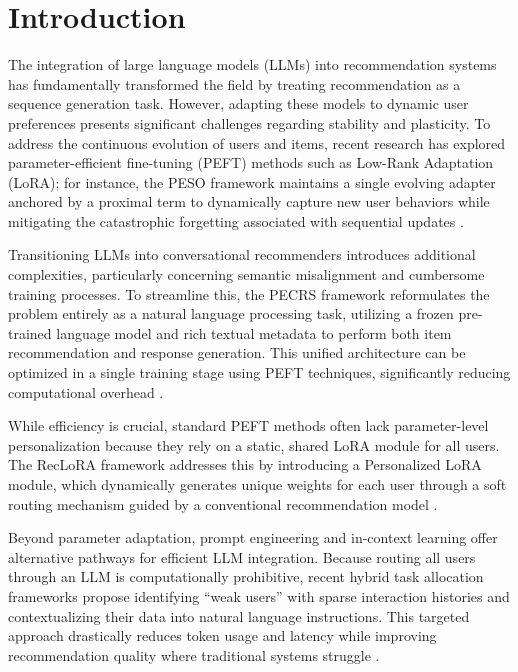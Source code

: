 \documentclass[journal,article,submit,pdftex,moreauthors]{Definitions/mdpi}
\begin{document}

\section{Introduction}

The integration of large language models (LLMs) into recommendation systems has fundamentally transformed the field by treating recommendation as a sequence generation task. However, adapting these models to dynamic user preferences presents significant challenges regarding stability and plasticity. To address the continuous evolution of users and items, recent research has explored parameter-efficient fine-tuning (PEFT) methods such as Low-Rank Adaptation (LoRA); for instance, the PESO framework maintains a single evolving adapter anchored by a proximal term to dynamically capture new user behaviors while mitigating the catastrophic forgetting associated with sequential updates \citep{yoo2025continual}. 

Transitioning LLMs into conversational recommenders introduces additional complexities, particularly concerning semantic misalignment and cumbersome training processes. To streamline this, the PECRS framework reformulates the problem entirely as a natural language processing task, utilizing a frozen pre-trained language model and rich textual metadata to perform both item recommendation and response generation. This unified architecture can be optimized in a single training stage using PEFT techniques, significantly reducing computational overhead \citep{ravaut2024parameter}. 

While efficiency is crucial, standard PEFT methods often lack parameter-level personalization because they rely on a static, shared LoRA module for all users. The RecLoRA framework addresses this by introducing a Personalized LoRA module, which dynamically generates unique weights for each user through a soft routing mechanism guided by a conventional recommendation model \citep{zhu2024lifelong}. 

Beyond parameter adaptation, prompt engineering and in-context learning offer alternative pathways for efficient LLM integration. Because routing all users through an LLM is computationally prohibitive, recent hybrid task allocation frameworks propose identifying ``weak users'' with sparse interaction histories and contextualizing their data into natural language instructions. This targeted approach drastically reduces token usage and latency while improving recommendation quality where traditional systems struggle \citep{kaur2026efficient}. 
\end{document}
